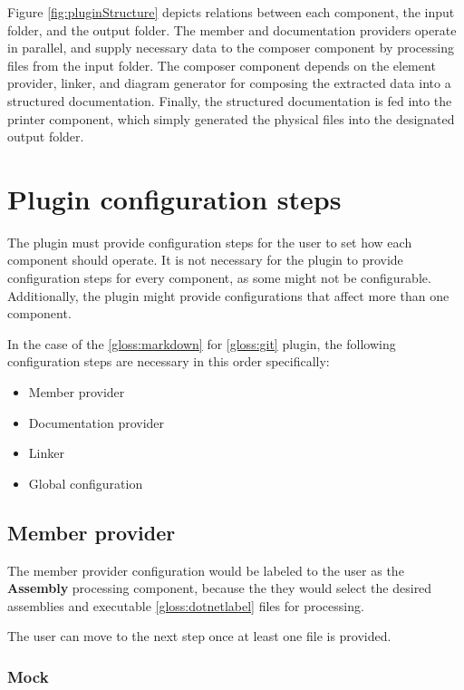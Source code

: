 Figure \ref{fig:pluginStructure} depicts relations between each component, the input folder, and the output folder. The member and documentation providers operate in parallel, and supply necessary data to the composer component by processing files from the input folder.
The composer component depends on the element provider, linker, and diagram generator for composing the extracted data into a structured documentation.
Finally, the structured documentation is fed into the printer component, which simply generated the physical files into the designated output folder.

\section{Plugin configuration steps}

The plugin must provide configuration steps for the user to set how each component should operate. It is not necessary for the plugin to provide configuration steps for every component, as some might not be configurable. Additionally, the plugin might provide configurations that affect more than one component.

In the case of the \ref{gloss:markdown} for \ref{gloss:git} plugin, the following configuration steps are necessary in this order specifically:
\begin{itemize}
    \item Member provider
    \item Documentation provider
    \item Linker
    \item Global configuration
\end{itemize}

\subsection{Member provider}

The member provider configuration would be labeled to the user as the \textbf{Assembly} processing component, because the they would select the desired assemblies and executable \ref{gloss:dotnetlabel} files for processing.

The user can move to the next step once at least one file is provided.

\subsubsection{Mock}

